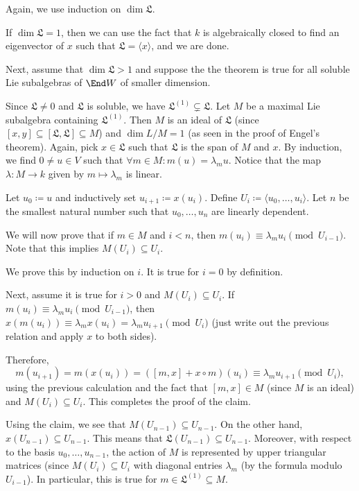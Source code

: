 Again, we use induction on $\dim \mathfrak{L}$.

If $\dim \mathfrak{L} = 1$, then we can use the fact that $k$ is algebraically
closed to find an eigenvector of $x$ such that $\mathfrak{L} = \langle x\rangle$,
and we are done.

Next, assume that $\dim \mathfrak{L} > 1$ and suppose the the theorem is true
for all soluble Lie subalgebras of $\End W$ of smaller dimension.

Since $\mathfrak{L} \neq 0$ and $\mathfrak{L} $ is soluble, we have
$\mathfrak{L}^{(1)}\subsetneq \mathfrak{L}$. Let $M$ be a maximal Lie
subalgebra containing $\mathfrak{L}^{(1)}$. Then $M$ is an ideal of $\mathfrak{L}$
(since $[x, y] \subseteq [\mathfrak{L}, \mathfrak{L}] \subseteq M$) and
$\dim L/M = 1$ (as seen in the proof of Engel's theorem). Again, pick $x \in \mathfrak{L}$
such that $\mathfrak{L}$ is the span of $M$ and $x$.
By induction, we find $0\neq u \in V$ such that
$\forall m \in M\colon m(u) = \lambda_mu$. Notice that the map
$\lambda\colon M\to k$ given by $m\mapsto \lambda_m$ is linear.

Let $u_0\coloneqq u$ and inductively set $u_{i+1}\coloneqq x(u_i)$. Define
$U_i\coloneqq \langle u_0, \ldots, u_i\rangle$. Let $n$ be the smallest natural
number such that  $u_0, \ldots, u_n$ are linearly dependent.

We will now prove that if $m \in M$ and $i < n$, then
$m(u_i) \equiv \lambda_mu_i\pmod{U_{i-1}}$.
Note that this implies $M(U_i) \subseteq U_i$.

We prove this by induction on $i$. It is true for $i = 0$ by definition.

Next, assume it is true for $i > 0$ and $M(U_i) \subseteq U_i$. If
$m(u_i) \equiv \lambda_mu_i\pmod{U_{i-1}}$,
then $x(m(u_i)) \equiv \lambda_m x(u_i) = \lambda_m u_{i+1} \pmod{U_i}$ (just write out the previous
relation and apply $x$ to both sides).

Therefore,
\[ m(u_{i+1}) = m(x(u_i)) = ([m, x] + x \circ m)(u_i) \equiv \lambda_mu_{i+1}\pmod{U_i}, \]
using the previous calculation and the fact that $[m, x] \in M$ (since $M$ is
an ideal) and $M(U_i) \subseteq U_i$. This completes the proof of the claim.

Using the claim, we see that $M(U_{n - 1}) \subseteq U_{n-1}$.  On the other hand,
$x(U_{n-1}) \subseteq U_{n-1}$. This means that $\mathfrak{L}(U_{n-1}) \subseteq U_{n-1}$.
Moreover, with respect to the basis
$u_0, \ldots, u_{n-1}$, the action of $M$ is represented by upper triangular
matrices (since $M(U_i) \subseteq U_i$ with diagonal entries $\lambda_m$ (by the
formula modulo $U_{i-1}$). In particular, this is true for
$m \in \mathfrak{L}^{(1)} \subseteq M$.

